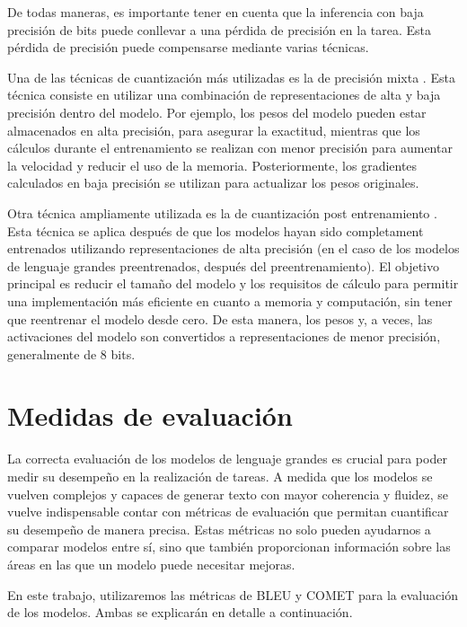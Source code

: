 \documentclass[11pt,spanish,listoffigures,listoftables]{tfgetsinf}
\begin{document}
De todas maneras, es importante tener en cuenta que la inferencia con baja precisión de bits puede conllevar a una pérdida de precisión en la tarea. Esta pérdida de precisión puede compensarse mediante varias técnicas.

Una de las técnicas de cuantización más utilizadas es la de precisión mixta \cite{micikevicius2018mixedprecisiontraining}. Esta técnica consiste en utilizar una combinación de representaciones de alta y baja precisión dentro del modelo. Por ejemplo, los pesos del modelo pueden estar almacenados en alta precisión, para asegurar la exactitud, mientras que los cálculos durante el entrenamiento se realizan con menor precisión para aumentar la velocidad y reducir el uso de la memoria. Posteriormente, los gradientes calculados en baja precisión se utilizan para actualizar los pesos originales.

Otra técnica ampliamente utilizada es la de cuantización post entrenamiento \cite{xiao2024smoothquantaccurateefficientposttraining}. Esta técnica se aplica después de que los modelos hayan sido completament entrenados utilizando representaciones de alta precisión (en el caso de los modelos de lenguaje grandes preentrenados, después del preentrenamiento). El objetivo principal es reducir el tamaño del modelo y los requisitos de cálculo para permitir una implementación más eficiente en cuanto a memoria y computación, sin tener que reentrenar el modelo desde cero. De esta manera, los pesos y, a veces, las activaciones del modelo son convertidos a representaciones de menor precisión, generalmente de 8 bits.

\section{Medidas de evaluación} \label{metricas}

La correcta evaluación de los modelos de lenguaje grandes es crucial para poder medir su desempeño en la realización de tareas. A medida que los modelos se vuelven complejos y capaces de generar texto con mayor coherencia y fluidez, se vuelve indispensable contar con métricas de evaluación que permitan cuantificar su desempeño de manera precisa. Estas métricas no solo pueden ayudarnos a comparar modelos entre sí, sino que también proporcionan información sobre las áreas en las que un modelo puede necesitar mejoras.

En este trabajo, utilizaremos las métricas de BLEU y COMET para la evaluación de los modelos. Ambas se explicarán en detalle a continuación.
\end{document}
